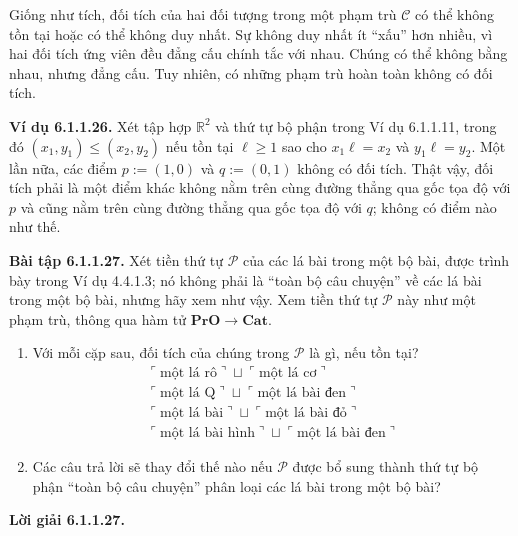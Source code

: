 Giống như tích, đối tích của hai đối tượng trong một phạm trù $\mathcal C$ có thể không tồn tại hoặc có thể không duy nhất. Sự không duy nhất ít ``xấu'' hơn nhiều, vì hai đối tích ứng viên đều đẳng cấu chính tắc với nhau. Chúng có thể không bằng nhau, nhưng đẳng cấu. Tuy nhiên, có những phạm trù hoàn toàn không có đối tích.

\noindent\textbf{Ví dụ 6.1.1.26.} Xét tập hợp $\mathbb R^2$ và thứ tự bộ phận trong Ví dụ 6.1.1.11, trong đó $(x_1,y_1)\le(x_2,y_2)$ nếu tồn tại $\ell\ge1$ sao cho $x_1\ell=x_2$ và $y_1\ell=y_2$. Một lần nữa, các điểm $p:=(1,0)$ và $q:=(0,1)$ không có đối tích. Thật vậy, đối tích phải là một điểm khác không nằm trên cùng đường thẳng qua gốc tọa độ với $p$ và cũng nằm trên cùng đường thẳng qua gốc tọa độ với $q$; không có điểm nào như thế.

\noindent\textbf{Bài tập 6.1.1.27.} Xét tiền thứ tự $\mathcal P$ của các lá bài trong một bộ bài, được trình bày trong Ví dụ 4.4.1.3; nó không phải là ``toàn bộ câu chuyện'' về các lá bài trong một bộ bài, nhưng hãy xem như vậy. Xem tiền thứ tự $\mathcal P$ này như một phạm trù, thông qua hàm tử $\mathbf{PrO}\to\mathbf{Cat}$.
\begin{enumerate}[label=\alph*.]
\item Với mỗi cặp sau, đối tích của chúng trong $\mathcal P$ là gì, nếu tồn tại?
\[\begin{gathered}\ulcorner\text{một lá rô}\urcorner\sqcup\ulcorner\text{một lá cơ}\urcorner\\\ulcorner\text{một lá Q}\urcorner\sqcup\ulcorner\text{một lá bài đen}\urcorner\\\ulcorner\text{một lá bài}\urcorner\sqcup\ulcorner\text{một lá bài đỏ}\urcorner\\\ulcorner\text{một lá bài hình}\urcorner\sqcup\ulcorner\text{một lá bài đen}\urcorner\end{gathered}\]
\item Các câu trả lời sẽ thay đổi thế nào nếu $\mathcal P$ được bổ sung thành thứ tự bộ phận ``toàn bộ câu chuyện'' phân loại các lá bài trong một bộ bài?
\end{enumerate}
\noindent\textbf{Lời giải 6.1.1.27.}\keepwithnext
